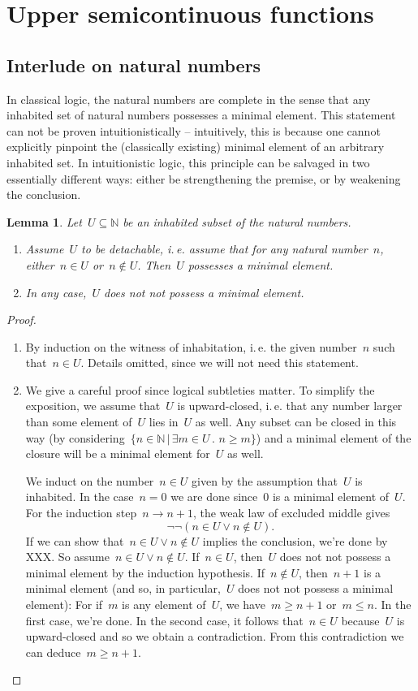 \documentclass[10pt]{amsart}
\theoremstyle{definition}
\theoremstyle{plain}
\newtheorem{lemma}[defn]{Lemma}
\theoremstyle{remark}
\newcommand{\NN}{\mathbb{N}}
\newcommand{\?}{\,{:}\,}
\renewcommand{\_}{\mathpunct{.}\,}
\begin{document}
\section{Upper semicontinuous functions}

\subsection{Interlude on natural numbers}
In classical logic, the natural numbers are complete in the sense that any
inhabited set of natural numbers possesses a minimal element. This statement
can not be proven intuitionistically -- intuitively, this is because one cannot
explicitly pinpoint the (classically existing) minimal element of an arbitrary
inhabited set. In intuitionistic logic, this principle can be salvaged in two
essentially different ways: either be strengthening the premise, or by
weakening the conclusion.

\begin{lemma}Let~$U \subseteq \NN$ be an inhabited subset of the natural
numbers.
\begin{enumerate}
\item Assume~$U$ to be \emph{detachable}, i.\,e. assume that for any natural
number~$n$, either~$n \in U$ or~$n \not\in U$. Then~$U$ possesses a minimal
element.
\item In any case,~$U$ does \emph{not not} possess a minimal element.
\end{enumerate}
\end{lemma}
\begin{proof}
\begin{enumerate}
\item By induction on the witness of inhabitation, i.\,e. the given number~$n$ such
that~$n \in U$. Details omitted, since we will not need this statement.
\item We give a careful proof since logical subtleties matter. To simplify the
exposition, we assume that~$U$ is upward-closed, i.\,e. that any number
larger than some element of~$U$ lies in~$U$ as well. Any subset can be closed
in this way (by considering~$\{ n \in \NN \,|\, \exists m \in U\_ n \geq m \}$)
and a minimal element of the closure will be a minimal element for~$U$ as well.

We induct on the number~$n \in U$ given by the assumption that~$U$ is
inhabited. In the case~$n = 0$ we are done since~$0$ is a minimal element
of~$U$. For the induction step~$n \to n+1$, the weak law of excluded middle
gives
\[ \neg\neg(n \in U \vee n \not\in U). \]
If we can show that~$n \in U \vee n \not\in U$ implies the conclusion, we're
done by XXX. So assume~$n \in U \vee n \not\in U$.
If~$n \in U$, then~$U$ does not not possess a minimal element by the induction
hypothesis. If~$n \not\in U$, then~$n+1$ is a minimal element (and so, in
particular,~$U$ does not not possess a minimal element): For if~$m$ is
any element of~$U$, we have~$m \geq n+1$ or~$m \leq n$. In the first case,
we're done. In the second case, it follows that~$n \in U$ because~$U$ is
upward-closed and so we obtain a contradiction. From this contradiction we can
deduce~$m \geq n+1$. \qedhere
\end{enumerate}
\end{proof}
\end{document}
